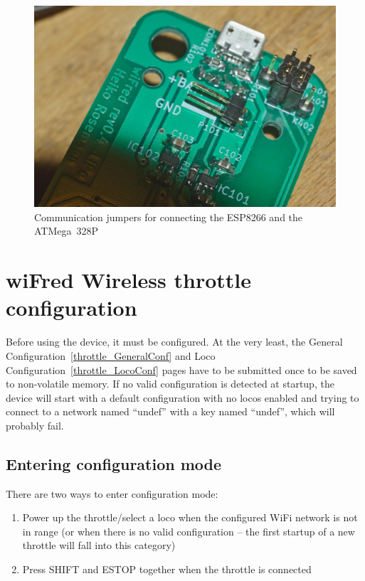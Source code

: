 \documentclass[11pt,a4paper]{scrartcl}
\begin{document}
\begin{figure}[tbhp]
  \centering
  \includegraphics[width=0.8 \textwidth]{images/_DSC0149}
  \caption{Communication jumpers for connecting the ESP8266 and the ATMega~328P}
  \label{serialJumpers}
\end{figure}

\clearpage

\section{wiFred Wireless throttle configuration} \label{config}

Before using the device, it must be configured. At the very least, the General Configuration~\ref{throttle_GeneralConf} and Loco Configuration~\ref{throttle_LocoConf} pages have to be submitted once to be saved to non-volatile memory. If no valid configuration is detected at startup, the device will start with a default configuration with no locos enabled and trying to connect to a network named ``undef'' with a key named ``undef'', which will probably fail.

\subsection{Entering configuration mode}

There are two ways to enter configuration mode:

\begin{enumerate}
\item Power up the throttle/select a loco when the configured WiFi network is not in range (or when there is no valid configuration -- the first startup of a new throttle will fall into this category)
\item Press SHIFT and ESTOP together when the throttle is connected
\end{enumerate}
\end{document}
